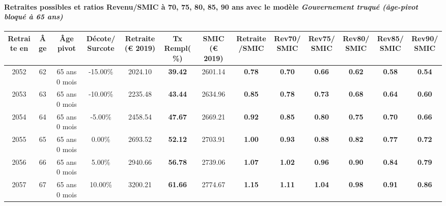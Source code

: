 \paragraph{Retraites possibles et ratios Revenu/SMIC à 70, 75, 80, 85, 90 ans avec le modèle \emph{Gouvernement truqué (âge-pivot bloqué à 65 ans)}}  
 
{ \scriptsize \begin{center} 
\begin{tabular}[htb]{|c|c||c|c||c|c||c||c|c|c|c|c|c|} 
\hline 
 Retraite en &  Âge &  Âge pivot &  Décote/Surcote &  Retraite (\euro{} 2019) &  Tx Rempl(\%) &  SMIC (\euro{} 2019) &  Retraite/SMIC &  Rev70/SMIC &  Rev75/SMIC &  Rev80/SMIC &  Rev85/SMIC &  Rev90/SMIC \\ 
\hline \hline 
 2052 &  62 &  65 ans 0 mois &  -15.00\% &  2024.10 &  {\bf 39.42} &  2601.14 &  {\bf {\color{red} 0.78}} &  {\bf {\color{red} 0.70}} &  {\bf {\color{red} 0.66}} &  {\bf {\color{red} 0.62}} &  {\bf {\color{red} 0.58}} &  {\bf {\color{red} 0.54}} \\ 
\hline 
 2053 &  63 &  65 ans 0 mois &  -10.00\% &  2235.48 &  {\bf 43.44} &  2634.96 &  {\bf {\color{red} 0.85}} &  {\bf {\color{red} 0.78}} &  {\bf {\color{red} 0.73}} &  {\bf {\color{red} 0.68}} &  {\bf {\color{red} 0.64}} &  {\bf {\color{red} 0.60}} \\ 
\hline 
 2054 &  64 &  65 ans 0 mois &  -5.00\% &  2458.54 &  {\bf 47.67} &  2669.21 &  {\bf {\color{red} 0.92}} &  {\bf {\color{red} 0.85}} &  {\bf {\color{red} 0.80}} &  {\bf {\color{red} 0.75}} &  {\bf {\color{red} 0.70}} &  {\bf {\color{red} 0.66}} \\ 
\hline 
 2055 &  65 &  65 ans 0 mois &  0.00\% &  2693.52 &  {\bf 52.12} &  2703.91 &  {\bf {\color{red} 1.00}} &  {\bf {\color{red} 0.93}} &  {\bf {\color{red} 0.88}} &  {\bf {\color{red} 0.82}} &  {\bf {\color{red} 0.77}} &  {\bf {\color{red} 0.72}} \\ 
\hline 
 2056 &  66 &  65 ans 0 mois &  5.00\% &  2940.66 &  {\bf 56.78} &  2739.06 &  {\bf 1.07} &  {\bf 1.02} &  {\bf {\color{red} 0.96}} &  {\bf {\color{red} 0.90}} &  {\bf {\color{red} 0.84}} &  {\bf {\color{red} 0.79}} \\ 
\hline 
 2057 &  67 &  65 ans 0 mois &  10.00\% &  3200.21 &  {\bf 61.66} &  2774.67 &  {\bf 1.15} &  {\bf 1.11} &  {\bf 1.04} &  {\bf {\color{red} 0.98}} &  {\bf {\color{red} 0.91}} &  {\bf {\color{red} 0.86}} \\ 
\hline 
\hline 
\end{tabular} 
\end{center} } 
